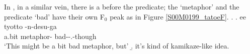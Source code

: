In \Next,
in a similar vein,
there is a  before the predicate;
the   `metaphor' and the predicate  `bad' have their own F$_{0}$ peak as in Figure \ref{S00M0199_tatoeF}.
%
\ex.\label{S00M0199_tatoe}
 \ag. ee tyotto \tp{\dvline}  \tp{\dvline} -n-desu-ga \tp{\dvline} \\
 		 a.bit {} metaphor- {} bad--.-though {} \\
		`This might be a bit bad metaphor, but'
 \b. it's kind of kamikaze-like idea.

